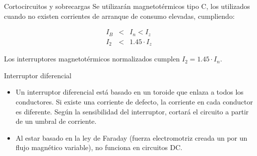 \documentclass[xcolor={usenames,svgnames,dvipsnames}]{beamer}
\begin{document}
\begin{frame}[label=sec-5-2-3]{Cortocircuitos y sobrecargas}
Se utilizarán \alert{magnetotérmicos tipo C}, los utilizados cuando no existen
corrientes de arranque de consumo elevadas, cumpliendo:

$$\begin{aligned}
I_{B} & < & I_{n}<I_{z}\\
I_{2} & < & 1.45\cdot I_{z}\end{aligned}$$

Los interruptores magnetotérmicos normalizados cumplen
$I_{2}=1.45\cdot I_{n}$.
\end{frame}

\begin{frame}[label=sec-5-2-4]{Interruptor diferencial}
\begin{itemize}
\item Un interruptor diferencial está basado en un toroide que enlaza a
todos los conductores. Si existe una corriente de defecto, la
corriente en cada conductor es diferente. Según la sensibilidad del
interruptor, cortará el circuito a partir de un umbral de corriente.

\item Al estar basado en la ley de Faraday (fuerza electromotriz creada un
por un flujo magnético variable), \alert{no funciona en circuitos DC}.
\end{itemize}
\end{frame}
\end{document}
